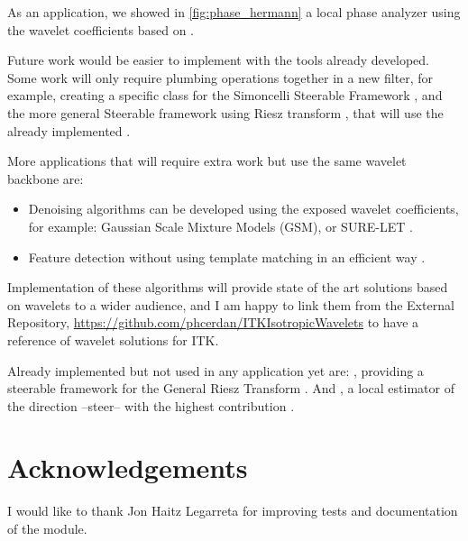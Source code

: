 As an application, we showed in \autoref{fig:phase_hermann} a local phase analyzer using the wavelet coefficients based on \cite{held_steerable_2010}.

Future work would be easier to implement with the tools already developed. Some work will only require plumbing operations together in a new filter, for example, creating a specific class for the Simoncelli Steerable Framework \cite{simoncelli_steerable_1995}, and the more general Steerable framework using Riesz transform \cite{unser_steerable_2011}, that will use the already implemented .

More applications that will require extra work but use the same wavelet backbone are:
\begin{itemize}[topsep=0pt]
  \item Denoising algorithms can be developed using the exposed wavelet coefficients, for example: Gaussian Scale Mixture Models (GSM)\cite{portilla_image_2003}, or SURE-LET \cite{blu_sure-let_2007}.
  \item Feature detection without using template matching in an efficient way \cite{puspoki_template-free_2015}.
\end{itemize}

 Implementation of these algorithms will provide state of the art solutions based on wavelets to a wider audience, and I am happy to link them from the External Repository, \url{https://github.com/phcerdan/ITKIsotropicWavelets} to have a reference of wavelet solutions for ITK.

 Already implemented but not used in any application yet are: , providing a steerable framework for the General Riesz Transform \cite{unser_steerable_2011}. And , a local estimator of the direction --steer-- with the highest contribution \cite{chenouard_3d_2012}.

\section{Acknowledgements}
\label{sec:Acknow}
I would like to thank Jon Haitz Legarreta for improving tests and documentation of the module.

%

%
%
% 
